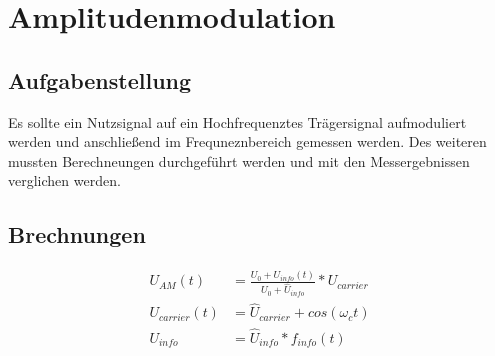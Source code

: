 \section{Amplitudenmodulation}
\subsection{Aufgabenstellung}
Es sollte ein Nutzsignal auf ein Hochfrequenztes Tr\"agersignal aufmoduliert werden und anschlie\ss{}end im Frequneznbereich gemessen werden. Des weiteren mussten Berechneungen durchgef\"uhrt werden und mit den Messergebnissen verglichen werden.

\subsection{Brechnungen}
\begin{center}
  \begin{align*}
    U_{AM}(t) &= \frac{U_0 + U_{info}(t)}{U_0 + \hat{U}_{info}} * U_{carrier}\\
    U_{carrier}(t) &= \hat{U}_{carrier}+cos(\omega_c t)\\
    U_{info} &= \hat{U}_{info} * f_{info}(t)
  \end{align*}
\end{center}
